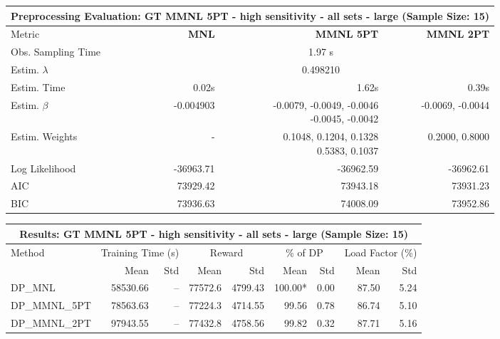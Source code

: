
\begin{samepage}
\begin{center}
  \small
  \begin{tabular}{l|r|r|r}
    \toprule
    \multicolumn{4}{c}{\textbf{Preprocessing Evaluation: GT MMNL 5PT - high sensitivity - all sets - large (Sample Size: 15)}} \\
    \midrule
    Metric & \textbf{MNL} & \textbf{MMNL 5PT} & \textbf{MMNL 2PT} \\
    \midrule
    Obs. Sampling Time & \multicolumn{3}{c}{1.97 s} \\
    Estim. $\lambda$ & \multicolumn{3}{c}{0.498210} \\
    Estim. Time & 0.02s & 1.62s & 0.39s \\
    Estim. $\beta$ & -0.004903 & \makecell[tr]{-0.0079, -0.0049, -0.0046 \\ -0.0045, -0.0042} & -0.0069, -0.0044 \\
    Estim. Weights & - & \makecell[tr]{0.1048, 0.1204, 0.1328 \\ 0.5383, 0.1037} & 0.2000, 0.8000 \\
    Log Likelihood & -36963.71 & -36962.59 & -36962.61 \\
    AIC & 73929.42 & 73943.18 & 73931.23 \\
    BIC & 73936.63 & 74008.09 & 73952.86 \\
    \bottomrule
  \end{tabular}
\end{center}
\begin{center}
  \small
  \begin{tabular}{l|rr|rr|rr|rr}
    \toprule
    \multicolumn{9}{c}{\textbf{Results: GT MMNL 5PT - high sensitivity - all sets - large (Sample Size: 15)}} \\
    \midrule
    Method & \multicolumn{2}{c|}{Training Time (s)} & \multicolumn{2}{c|}{Reward} & \multicolumn{2}{c|}{\% of DP} & \multicolumn{2}{c}{Load Factor (\%)} \\
    & Mean & Std & Mean & Std & Mean & Std & Mean & Std \\
    \midrule
    DP\_MNL      & 58530.66 &    -- &    77572.6 &    4799.43 & 100.00* &    0.00 &   87.50 &    5.24 \\
    DP\_MMNL\_5PT & 78563.63 &    -- &    77224.3 &    4714.55 &   99.56 &    0.78 &   86.74 &    5.10 \\
    DP\_MMNL\_2PT & 97943.55 &    -- &    77432.8 &    4758.56 &   99.82 &    0.32 &   87.71 &    5.16 \\

\end{tabular}
\end{center}
\end{samepage}
